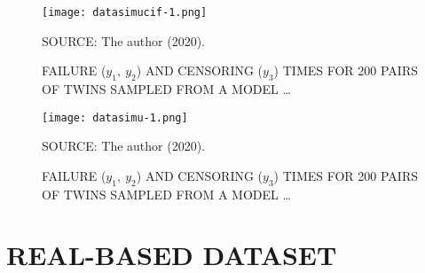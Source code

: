 \begin{figure}[H]
  \setlength{\abovecaptionskip}{.0001pt}
  \caption{FAILURE (\(y_{1},~y_{2}\)) AND CENSORING (\(y_{3}\)) TIMES
    FOR 200 PAIRS OF TWINS SAMPLED FROM A MODEL \dots}
  \vspace{0.425cm} \centering
  \texttt{[image: datasimucif-1.png]}
  \\
  \vspace{0.45cm}
  \begin{footnotesize}
    SOURCE: The author (2020).
  \end{footnotesize}
  \label{fig:datasimucif}
\end{figure}

\begin{figure}[H]
  \setlength{\abovecaptionskip}{.0001pt}
  \caption{FAILURE (\(y_{1},~y_{2}\)) AND CENSORING (\(y_{3}\)) TIMES
    FOR 200 PAIRS OF TWINS SAMPLED FROM A MODEL \dots}
  \vspace{0.2cm} \centering
  \texttt{[image: datasimu-1.png]}
  \\
  \vspace{0.2cm}
  \begin{footnotesize}
    SOURCE: The author (2020).
  \end{footnotesize}
  \label{fig:datasimu}
\end{figure}

\section{REAL-BASED DATASET}
\label{cap:data}


